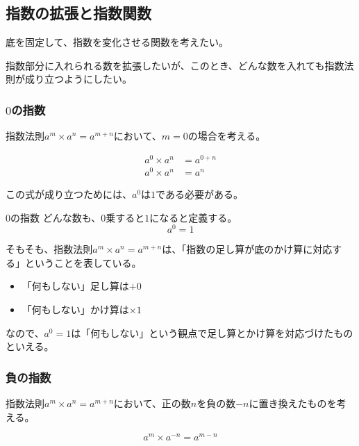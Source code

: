 \documentclass[../math-imaging]{subfiles}
\begin{document}
\subsection{指数の拡張と指数関数}

底を固定して、指数を変化させる関数を考えたい。

指数部分に入れられる数を拡張したいが、このとき、どんな数を入れても指数法則が成り立つようにしたい。

\subsubsection{$0$の指数}

指数法則$a^m \times a^n = a^{m+n}$において、$m=0$の場合を考える。

\begin{align}
  a^0 \times a^n & = a^{0+n} \\
  a^0 \times a^n & = a^n
\end{align}

この式が成り立つためには、$a^0$は$1$である必要がある。

\begin{definition}{$0$の指数}
  \newline
  どんな数も、$0$乗すると$1$になると定義する。
  \LARGE
  \begin{equation}
    a^0 = 1
  \end{equation}
\end{definition}

そもそも、指数法則$a^m \times a^n = a^{m+n}$は、「指数の足し算が底のかけ算に対応する」ということを表している。

\begin{itemize}
  \item 「何もしない」足し算は$+ 0$
  \item 「何もしない」かけ算は$\times 1$
\end{itemize}

なので、$a^0 = 1$は「何もしない」という観点で足し算とかけ算を対応づけたものといえる。

\subsubsection{負の指数}

指数法則$a^m \times a^n = a^{m+n}$において、正の数$n$を負の数$-n$に置き換えたものを考える。

\begin{equation}
  a^m \times a^{-n} = a^{m-n}
\end{equation}
\end{document}
